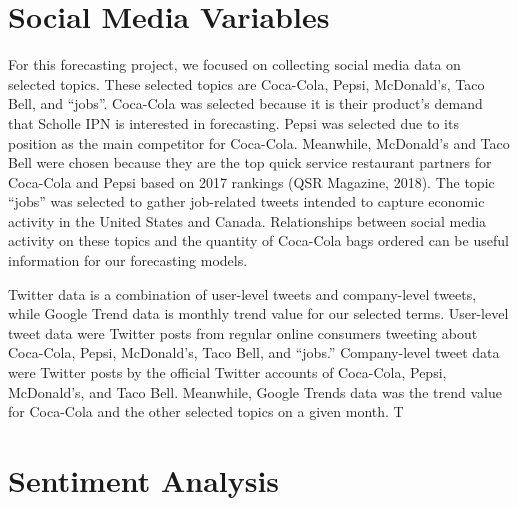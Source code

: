\documentclass[12pt,oneside]{chicagocapstone}
\begin{document}
\hypertarget{social-media-variables}{%
\section*{Social Media Variables}\label{social-media-variables}}

For this forecasting project, we focused on collecting social media data on selected topics. These selected topics are Coca-Cola, Pepsi, McDonald's, Taco Bell, and ``jobs''. Coca-Cola was selected because it is their product's demand that Scholle IPN is interested in forecasting. Pepsi was selected due to its position as the main competitor for Coca-Cola. Meanwhile, McDonald's and Taco Bell were chosen because they are the top quick service restaurant partners for Coca-Cola and Pepsi based on 2017 rankings (QSR Magazine, 2018). The topic ``jobs'' was selected to gather job-related tweets intended to capture economic activity in the United States and Canada. Relationships between social media activity on these topics and the quantity of Coca-Cola bags ordered can be useful information for our forecasting models.

Twitter data is a combination of user-level tweets and company-level tweets, while Google Trend data is monthly trend value for our selected terms. User-level tweet data were Twitter posts from regular online consumers tweeting about Coca-Cola, Pepsi, McDonald's, Taco Bell, and ``jobs.'' Company-level tweet data were Twitter posts by the official Twitter accounts of Coca-Cola, Pepsi, McDonald's, and Taco Bell. Meanwhile, Google Trends data was the trend value for Coca-Cola and the other selected topics on a given month. T

\hypertarget{sentiment-analysis}{%
\section*{Sentiment Analysis}\label{sentiment-analysis}}
\end{document}
